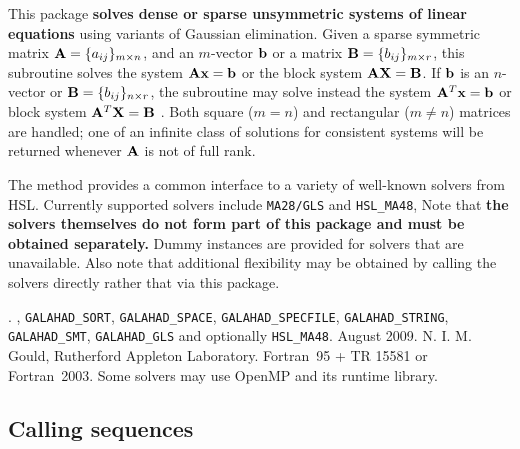 \documentclass{galahad}
\newcommand{\packagename}{ULS}
\newcommand{\fullpackagename}{\libraryname\_\-\packagename}
\begin{document}
\galheader


\galsummary

This package
{\bf solves dense or sparse unsymmetric systems of linear equations}
using variants of Gaussian elimination.
Given a sparse symmetric matrix ${\mathbf{A}} = \{ a_{ij} \}_{m \times n}$, and an
$m$-vector ${\mathbf{b}}$ or a matrix ${\mathbf{B}} = \{ b_{ij} \}_{m \times r}$, this
subroutine solves the system ${\mathbf{A}} {\mathbf{x}} = {\mathbf{b}}$
or the block system ${\mathbf{A}} {\mathbf{X}} = {\mathbf{B}}$. If
${\mathbf{b}}$ is an $n$-vector or  ${\mathbf{B}} = \{ b_{ij} \}_{n \times r}$,
the subroutine may solve instead the system ${\mathbf{A}}^T {\mathbf{x}} = {\mathbf{b}}$
or block system  ${\mathbf{A}}^T {\mathbf{X}} = {\mathbf{B}}$ . Both square ($m=n$) and
rectangular ($m\neq n$)  matrices are handled; one of an infinite
class of  solutions for consistent systems will be returned
whenever ${\mathbf{A}}$ is not of full rank.

\noindent The method provides a common interface to a variety of well-known
solvers from HSL.
Currently supported solvers include
{\tt MA28/GLS} and {\tt HSL\_MA48},
Note that
{\bf the solvers themselves do not form part of this package and must be obtained
separately.} Dummy instances are provided for solvers that are unavailable.
Also note that additional flexibility may be obtained by calling the
solvers directly rather that via this package.


\galattributes
\galversions{\tt  \fullpackagename\_single, \fullpackagename\_double}.
,
{\tt GALAHAD\_\-SORT},
{\tt GALAHAD\_SPACE},
{\tt GALAHAD\_SPECFILE},
{\tt GALAHAD\_STRING},
{\tt GALAHAD\_SMT},
{\tt GALAHAD\_GLS}
and optionally
{\tt HSL\_\-MA48}.
\galdate August 2009.
\galorigin N. I. M. Gould, Rutherford Appleton Laboratory.
\gallanguage Fortran~95 + TR 15581 or Fortran~2003.
\galparallelism Some solvers may use OpenMP and its runtime library.


\galhowto

\subsection{Calling sequences}
\end{document}
